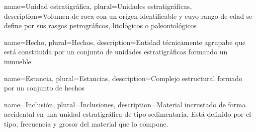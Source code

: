 \makeglossaries

{
	name=Unidad estratigráfica,
	plural=Unidades estratigráficas,
	description={Volumen de roca con un origen identificable y cuyo rango de edad se define
	por sus rasgos petrográficos, litológicos o paleontológicos}
}

{
	name=Hecho,
	plural=Hechos,
	description={Entidad técnicamente agrupabe que está constituida por un conjunto de unidades
	estratigráficas formando un inmueble}
}

{
	name=Estancia,
	plural=Estancias,
	description={Complejo estructural formado por un conjunto de hechos}
}

{
	name=Inclusión,
	plural=Inclusiones,
	description={Material incrustado de forma accidental en una unidad estratigráfica de tipo
	sedimentaria. Está definido por el tipo, frecuencia y grosor del material que lo compone.}
}

\glsaddall
